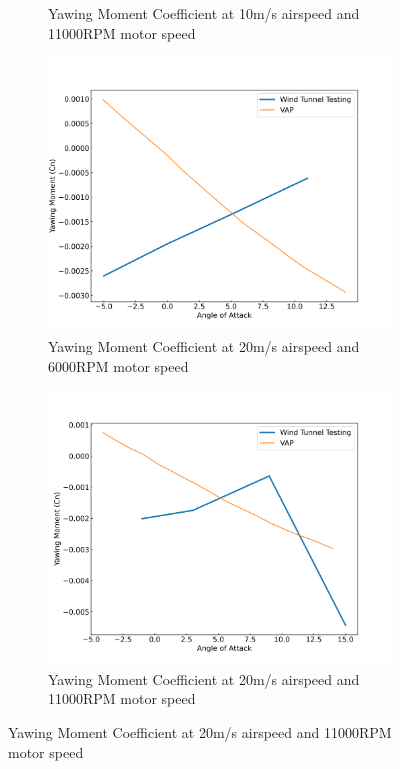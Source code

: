 \begin{figure}[H]
\begin{subfigure}[b]{0.467\textwidth}
        \caption{Yawing Moment Coefficient at 10m/s airspeed and 11000RPM motor speed}
        \label{fig:VAP_noProp_Cm_10ms_11000}
    \end{subfigure}
    \begin{subfigure}[b]{0.467\textwidth}
        \centering
        \includegraphics[width=\textwidth]{05_Results/VAP/noProp/Cn/20ms_6000RPM_Cn.png}
        \caption{Yawing Moment Coefficient at 20m/s airspeed and 6000RPM motor speed}
        \label{fig:VAP_noProp_Cm_20ms_6000}
    \end{subfigure}
    \begin{subfigure}[b]{0.467\textwidth}
        \centering
        \includegraphics[width=\textwidth]{05_Results/VAP/noProp/Cn/20ms_11000RPM_Cn.png}
        \caption{Yawing Moment Coefficient at 20m/s airspeed and 11000RPM motor speed}
        \label{fig:VAP_noProp_Cm_20ms_11000}
    \end{subfigure}
\end{figure}



